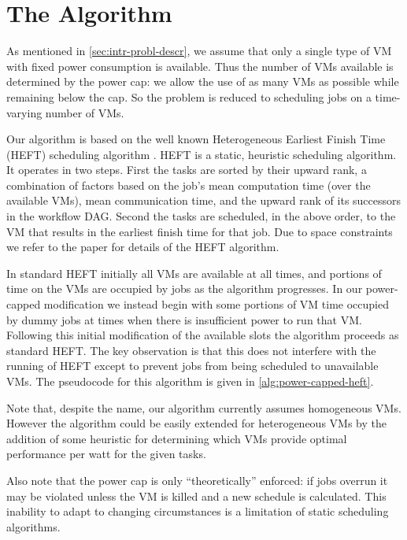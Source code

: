 \documentclass[10pt, conference, compsocconf]{IEEEtran} %
\begin{document}
\section{The Algorithm}

As mentioned in \cref{sec:intr-probl-descr}, we assume that only a single type of VM with fixed power consumption is available.
Thus the number of VMs available is determined by the power cap: we allow the use of as many VMs as possible while remaining below the cap.
So the problem is reduced to scheduling jobs on a time-varying number of VMs.

Our algorithm is based on the well known Heterogeneous Earliest Finish Time (HEFT) scheduling algorithm \cite{Topcuoglu2002heft}.
HEFT is a static, heuristic scheduling algorithm.
It operates in two steps.
First the tasks are sorted by their upward rank, a combination of factors based on the job's mean computation time (over the available VMs), mean communication time, and the upward rank of its successors in the workflow DAG.
Second the tasks are scheduled, in the above order, to the VM that results in the earliest finish time for that job.
Due to space constraints we refer to the paper \cite{Topcuoglu2002heft} for details of the HEFT algorithm.

In standard HEFT initially all VMs are available at all times, and portions of time on the VMs are occupied by jobs as the algorithm progresses.
In our power-capped modification we instead begin with some portions of VM time occupied by dummy jobs at times when there is insufficient power to run that VM.
Following this initial modification of the available slots the algorithm proceeds as standard HEFT.
The key observation is that this does not interfere with the running of HEFT except to prevent jobs from being scheduled to unavailable VMs.
The pseudocode for this algorithm is given in \cref{alg:power-capped-heft}.

Note that, despite the name, our algorithm currently assumes homogeneous VMs.
However the algorithm could be easily extended for heterogeneous VMs by the addition of some heuristic for determining which VMs provide optimal performance per watt for the given tasks.

Also note that the power cap is only ``theoretically'' enforced: if jobs overrun it may be violated unless the VM is killed and a new schedule is calculated.
This inability to adapt to changing circumstances is a limitation of static scheduling algorithms.
\end{document}
